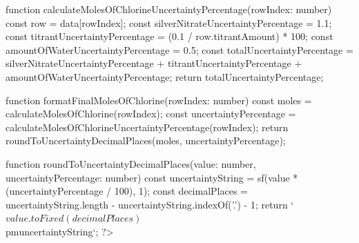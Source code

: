 \documentclass[11pt]{article}
\begin{document}
function calculateMolesOfChlorineUncertaintyPercentage(rowIndex: number) {
	const row = data[rowIndex];
	const silverNitrateUncertaintyPercentage = 1.1;
	const titrantUncertaintyPercentage = (0.1 / row.titrantAmount) * 100;
	const amountOfWaterUncertaintyPercentage = 0.5;
	const totalUncertaintyPercentage =
		silverNitrateUncertaintyPercentage +
		titrantUncertaintyPercentage +
		amountOfWaterUncertaintyPercentage;
	return totalUncertaintyPercentage;
}

function formatFinalMolesOfChlorine(rowIndex: number) {
	const moles = calculateMolesOfChlorine(rowIndex);
	const uncertaintyPercentage = calculateMolesOfChlorineUncertaintyPercentage(rowIndex);
	return roundToUncertaintyDecimalPlaces(moles, uncertaintyPercentage);
}

function roundToUncertaintyDecimalPlaces(value: number, uncertaintyPercentage: number) {
	const uncertaintyString = sf(value * (uncertaintyPercentage / 100), 1);
	const decimalPlaces = uncertaintyString.length - uncertaintyString.indexOf('.') - 1;
	return `${value.toFixed(decimalPlaces)} $\\pm$ ${uncertaintyString}`;
}
?>
\end{document}

